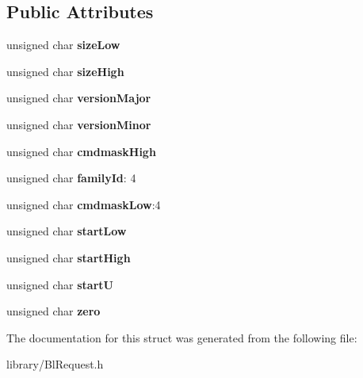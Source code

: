 \subsection*{Public Attributes}
\begin{DoxyCompactItemize}
\item 
\hypertarget{struct_bl_info_af53fd31e97f796089198cf77681ba9cb}{unsigned char {\bfseries size\-Low}}\label{struct_bl_info_af53fd31e97f796089198cf77681ba9cb}

\item 
\hypertarget{struct_bl_info_a17fd7e3d13075c98cb3589a5670eaa27}{unsigned char {\bfseries size\-High}}\label{struct_bl_info_a17fd7e3d13075c98cb3589a5670eaa27}

\item 
\hypertarget{struct_bl_info_adecf35498759a50f70cfd720930c2fee}{unsigned char {\bfseries version\-Major}}\label{struct_bl_info_adecf35498759a50f70cfd720930c2fee}

\item 
\hypertarget{struct_bl_info_a013455b390e6a994503fc913ef4962ec}{unsigned char {\bfseries version\-Minor}}\label{struct_bl_info_a013455b390e6a994503fc913ef4962ec}

\item 
\hypertarget{struct_bl_info_a6230bfa0bbba06b6d4cbf4a091f29206}{unsigned char {\bfseries cmdmask\-High}}\label{struct_bl_info_a6230bfa0bbba06b6d4cbf4a091f29206}

\item 
\hypertarget{struct_bl_info_aa83c1399c74fbc43483497e25d01a944}{unsigned char {\bfseries family\-Id}\-: 4}\label{struct_bl_info_aa83c1399c74fbc43483497e25d01a944}

\item 
\hypertarget{struct_bl_info_a1f12826be55d13f19c756bc5e3428b3c}{unsigned char {\bfseries cmdmask\-Low}\-:4}\label{struct_bl_info_a1f12826be55d13f19c756bc5e3428b3c}

\item 
\hypertarget{struct_bl_info_a4d08750ac1951abfae43f350f11e6e74}{unsigned char {\bfseries start\-Low}}\label{struct_bl_info_a4d08750ac1951abfae43f350f11e6e74}

\item 
\hypertarget{struct_bl_info_a952bed33ae2583318cb548e5af1ee0f7}{unsigned char {\bfseries start\-High}}\label{struct_bl_info_a952bed33ae2583318cb548e5af1ee0f7}

\item 
\hypertarget{struct_bl_info_ad0ff495d980e4852f048e4b8f3f937aa}{unsigned char {\bfseries start\-U}}\label{struct_bl_info_ad0ff495d980e4852f048e4b8f3f937aa}

\item 
\hypertarget{struct_bl_info_a46dfaab15225f0149142be16b0976216}{unsigned char {\bfseries zero}}\label{struct_bl_info_a46dfaab15225f0149142be16b0976216}

\end{DoxyCompactItemize}


The documentation for this struct was generated from the following file\-:\begin{DoxyCompactItemize}
\item 
library/Bl\-Request.\-h\end{DoxyCompactItemize}
